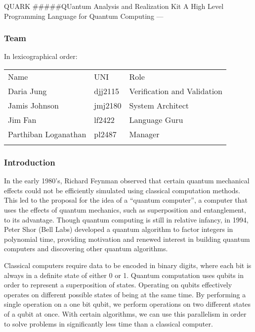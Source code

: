 \documentclass[]{article}
\date{}
\begin{document}
QUARK \#\#\#\#\#QUantum Analysis and Realization Kit A High Level
Programming Language for Quantum Computing ---

\subsubsection{Team}\label{team}

In lexicographical order:

\begin{longtable}[c]{@{}lll@{}}
\toprule\addlinespace
Name & UNI & Role
\\\addlinespace
\midrule\endhead
Daria Jung & djj2115 & Verification and Validation
\\\addlinespace
Jamis Johnson & jmj2180 & System Architect
\\\addlinespace
Jim Fan & lf2422 & Language Guru
\\\addlinespace
Parthiban Loganathan & pl2487 & Manager
\\\addlinespace
\bottomrule
\end{longtable}

\subsubsection{Introduction}\label{introduction}

In the early 1980's, Richard Feynman observed that certain quantum
mechanical effects could not be efficiently simulated using classical
computation methods. This led to the proposal for the idea of a
``quantum computer'', a computer that uses the effects of quantum
mechanics, such as superposition and entanglement, to its advantage.
Though quantum computing is still in relative infancy, in 1994, Peter
Shor (Bell Labs) developed a quantum algorithm to factor integers in
polynomial time, providing motivation and renewed interest in building
quantum computers and discovering other quantum algorithms.

Classical computers require data to be encoded in binary digits, where
each bit is always in a definite state of either 0 or 1. Quantum
computation uses qubits in order to represent a superposition of states.
Operating on qubits effectively operates on different possible states of
being at the same time. By performing a single operation on a one bit
qubit, we perform operations on two different states of a qubit at once.
With certain algorithms, we can use this parallelism in order to solve
problems in significantly less time than a classical computer.
\end{document}
